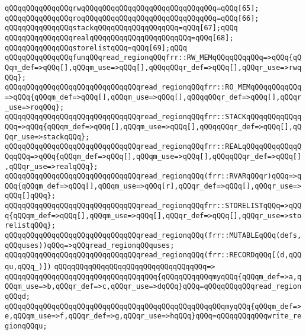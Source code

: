 \newline
\verb|qQQqqQQqqQQqqQQqrwqQQqqQQqqQQqqQQqqQQqqQQqqQQqqQQq=qQQq[65];|\newline
\verb|qQQqqQQqqQQqqQQqroqQQqqQQqqQQqqQQqqQQqqQQqqQQqqQQq=qQQq[66];|\newline
\verb|qQQqqQQqqQQqqQQqstackqQQqqQQqqQQqqQQqqQQq=qQQq[67];qQQq|\newline
\verb|qQQqqQQqqQQqqQQqrealqQQqqQQqqQQqqQQqqQQqqQQq=qQQq[68];|\newline
\verb|qQQqqQQqqQQqqQQqstorelistqQQq=qQQq[69];qQQq|\newline
\newline
\verb|qQQqqQQqqQQqqQQqfunqQQqread_regionqQQqfrr::RW_MEMqQQqqQQqqQQq=>qQQq{qQQqm_def=>qQQq[],qQQqm_use=>qQQq[],qQQqqQQqr_def=>qQQq[],qQQqr_use=>rwqQQq};|\newline
\verb|qQQqqQQqqQQqqQQqqQQqqQQqqQQqqQQqread_regionqQQqfrr::RO_MEMqQQqqQQqqQQq=>qQQq{qQQqm_def=>qQQq[],qQQqm_use=>qQQq[],qQQqqQQqr_def=>qQQq[],qQQqr_use=>roqQQq};|\newline
\verb|qQQqqQQqqQQqqQQqqQQqqQQqqQQqqQQqread_regionqQQqfrr::STACKqQQqqQQqqQQqqQQq=>qQQq{qQQqm_def=>qQQq[],qQQqm_use=>qQQq[],qQQqqQQqr_def=>qQQq[],qQQqr_use=>stackqQQq};|\newline
\verb|qQQqqQQqqQQqqQQqqQQqqQQqqQQqqQQqread_regionqQQqfrr::REALqQQqqQQqqQQqqQQqqQQq=>qQQq{qQQqm_def=>qQQq[],qQQqm_use=>qQQq[],qQQqqQQqr_def=>qQQq[],qQQqr_use=>realqQQq};|\newline
\verb|qQQqqQQqqQQqqQQqqQQqqQQqqQQqqQQqread_regionqQQq(frr::RVARqQQqr)qQQq=>qQQq{qQQqm_def=>qQQq[],qQQqm_use=>qQQq[r],qQQqr_def=>qQQq[],qQQqr_use=>qQQq[]qQQq};|\newline
\verb|qQQqqQQqqQQqqQQqqQQqqQQqqQQqqQQqread_regionqQQqfrr::STORELISTqQQq=>qQQq{qQQqm_def=>qQQq[],qQQqm_use=>qQQq[],qQQqr_def=>qQQq[],qQQqr_use=>storelistqQQq};|\newline
\verb|qQQqqQQqqQQqqQQqqQQqqQQqqQQqqQQqread_regionqQQq(frr::MUTABLEqQQq(defs,qQQquses))qQQq=>qQQqread_regionqQQquses;|\newline
\verb|qQQqqQQqqQQqqQQqqQQqqQQqqQQqqQQqread_regionqQQq(frr::RECORDqQQq[(d,qQQqu,qQQq_)])|\newline
\verb|qQQqqQQqqQQqqQQqqQQqqQQqqQQqqQQqqQQq=>|\newline
\verb|qQQqqQQqqQQqqQQqqQQqqQQqqQQqqQQqqQQq{qQQqqQQqqQQqmyqQQq{qQQqm_def=>a,qQQqm_use=>b,qQQqr_def=>c,qQQqr_use=>dqQQq}qQQq=qQQqqQQqqQQqread_regionqQQqd;|\newline
\verb|qQQqqQQqqQQqqQQqqQQqqQQqqQQqqQQqqQQqqQQqqQQqqQQqqQQqmyqQQq{qQQqm_def=>e,qQQqm_use=>f,qQQqr_def=>g,qQQqr_use=>hqQQq}qQQq=qQQqqQQqqQQqwrite_regionqQQqu;|\newline
